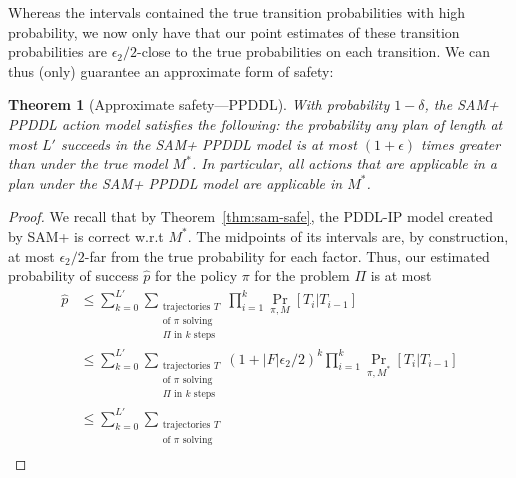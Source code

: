 \documentclass[letterpaper]{article} %
\newtheorem{theorem}{Theorem}
\begin{document}
Whereas the intervals contained the true transition probabilities with high probability, we now only have that our point estimates of these transition probabilities are $\epsilon_2/2$-close to the true probabilities on each transition. We can thus (only) guarantee an approximate form of safety:
\begin{theorem}[Approximate safety---PPDDL]
\label{thm:ppddl-sam-safe}
With probability $1-\delta$, the SAM+ PPDDL action model satisfies the following:
the probability any plan of length at most $L'$ succeeds in the SAM+ PPDDL model is at most $(1+\epsilon)$ times greater than under the true model $M^*$. In particular, all actions that are applicable in a plan under the SAM+ PPDDL model are applicable in $M^*$.
\end{theorem}
\begin{proof}
We recall that by Theorem~\ref{thm:sam-safe}, 
the PDDL-IP model created by SAM+ is correct w.r.t $M^*$. 
The midpoints of its intervals are, by construction, at most $\epsilon_2/2$-far from the true probability for each factor. Thus, our estimated probability of success $\hat{p}$ for the policy $\pi$ for the problem $\Pi$ is at most
\begin{align*}
\hat{p} &\leq 
\sum_{k=0}^{L'}\sum_{\substack{\text{trajectories }T\\\text{of }\pi\text{ solving}\\
\Pi\text{ in }k\text{ steps}}}\prod_{i=1}^k\Pr_{\pi,M}[T_i|T_{i-1}]\\
&\leq \sum_{k=0}^{L'}\sum_{\substack{\text{trajectories }T\\\text{of }\pi\text{ solving}\\\Pi\text{ in }k\text{ steps}}}(1+|F|\epsilon_2/2)^k\prod_{i=1}^k\Pr_{\pi,M^*}[T_i|T_{i-1}]\\
&\leq \sum_{k=0}^{L'}\sum_{\substack{\text{trajectories }T\\\text{of }\pi\text{ solving}\\
}}
\end{align*}
\end{proof}
\end{document}
